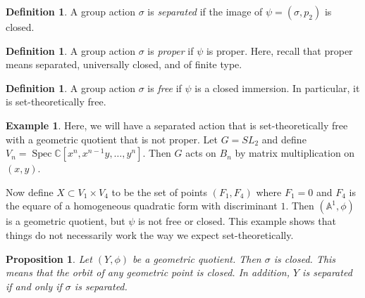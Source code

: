 \documentclass[leqno, openany]{memoir}
\newtheorem{prop}[thm]{Proposition}
\theoremstyle{definition}
\newtheorem{defn}[thm]{Definition}
\newtheorem{exm}[thm]{Example}
\theoremstyle{remark}
\theoremstyle{plain}
\theoremstyle{definition}
\theoremstyle{remark}
\newcommand{\A}{\mathbb{A}}
\newcommand{\C}{\mathbb{C}}
\DeclareMathOperator{\Spec}{Spec}
\begin{document}
\begin{defn}
    A group action $\sigma$ is \textit{separated} if the image of $\psi = (\sigma, p_2)$ is closed. 
\end{defn}

\begin{defn}
    A group action $\sigma$ is \textit{proper} if $\psi$ is proper. Here, recall that proper means separated, universally closed, and of finite type. 
\end{defn}

\begin{defn}
    A group action $\sigma$ is \textit{free} if $\psi$ is a closed immersion. In particular, it is set-theoretically free. 
\end{defn}

\begin{exm}
    Here, we will have a separated action that is set-theoretically free with a geometric quotient that is not proper. Let $G = SL_2$ and define $V_n = \Spec \C[x^n, x^{n-1}y, \ldots, y^n]$. Then $G$ acts on $B_n$ by matrix multiplication on $(x,y)$.

    Now define $X \subset V_1 \times V_4$ to be the set of points $(F_1, F_4)$ where $F_1 = 0$ and $F_4$ is the equare of a homogeneous quadratic form with discriminant $1$. Then $(\A^1, \phi)$ is a geometric quotient, but $\psi$ is not free or closed. This example shows that things do not necessarily work the way we expect set-theoretically.
\end{exm}

\begin{prop}
    Let $(Y, \phi)$ be a geometric quotient. Then $\sigma$ is closed. This means that the orbit of any geometric point is closed. In addition, $Y$ is separated if and only if $\sigma$ is separated.
\end{prop}
\end{document}
